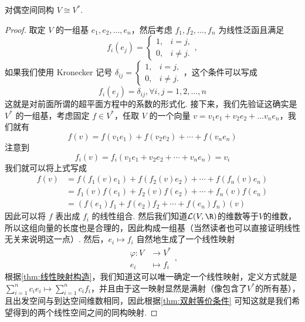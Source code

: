 
\begin{theorem}{}{对偶空间同构}
    $V \cong V^*$.
\end{theorem}

\begin{proof}
    取定 $V$ 的一组基 $e_1, e_2, \ldots, e_n$，然后考虑 $f_1, f_2, \ldots, f_n$ 为线性泛函且满足
    \[f_i(e_j) = \begin{cases}
            1, & i = j,    \\
            0, & i \neq j.
        \end{cases},\]
    如果我们使用 Kronecker 记号 $\delta_{ij}=\begin{cases}
            1, & i = j,    \\
            0, & i \neq j.
        \end{cases}$，这个条件可以写成
    \[f_i(e_j) = \delta_{ij}, \forall i, j = 1, 2, \ldots, n\]
    这就是对前面所谓的超平面方程中的系数的形式化. 接下来，我们先验证这确实是 $V^*$ 的一组基，考虑固定 $f \in V^*$，任取 $V$ 的一个向量 $v = v_1 e_1 + v_2 e_2 + \ldots v_n e_n$，我们就有
    \[f(v) = f(v_1 e_1) + f(v_2 e_2) + \cdots + f(v_n e_n)\]
    注意到
    \[f_i(v) = f_i (v_1 e_1 + v_2 e_2 + \cdots + v_n e_n) = v_i\]
    我们就可以将上式写成
    \begin{align*}
        f(v) & = f(f_1(v) e_1) + f(f_2(v) e_2) + \cdots + f(f_n(v) e_n) \\
             & = f_1(v) f(e_1) + f_2(v) f(e_2) + \cdots + f_n(v) f(e_n) \\
             & = (f(e_1) f_1 + f(e_2) f_2 + \cdots + f(e_n) f_n)(v)
    \end{align*}
    因此可以将 $f$ 表出成 $f_i$ 的线性组合. 然后我们知道$\mathcal{L}(V, \R)$的维数等于$V$的维数，所以这组向量的长度也是合理的，因此构成一组基（当然读者也可以直接证明线性无关来说明这一点）. 然后，$e_i \mapsto f_i$ 自然地生成了一个线性映射
    \begin{equation*}
        \begin{aligned}
            \varphi: V & \to V^*     \\
            e_i        & \mapsto f_i
        \end{aligned},
    \end{equation*}
    根据\autoref{thm:线性映射构造}，我们知道这可以唯一确定一个线性映射，定义方式就是$\sum_{i=1}^nc_ie_i \mapsto\sum_{i=1}^nc_if_i$，并且由于这一映射显然是满射（像包含了$V^*$的所有基），且出发空间与到达空间维数相同，因此根据\autoref{thm:双射等价条件} 可知这就是我们希望得到的两个线性空间之间的同构映射.
\end{proof}

